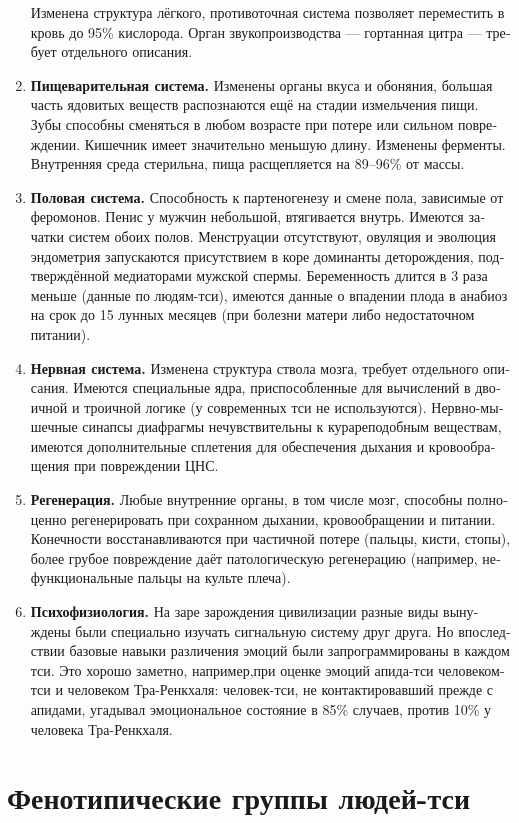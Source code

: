 \documentclass[a4paper,12pt,fleqn]{book}\usepackage{cooltooltips}\usepackage{polyglossia}\setdefaultlanguage[babelshorthands=true]{russian}\setotherlanguage{english}\defaultfontfeatures{Ligatures=TeX,Mapping=tex-text} \usepackage{xcolor}\definecolor{lightgray}{HTML}{bbbbbb}\color{lightgray}\newcommand{\ml}[3]{\textenglish{\textcolor{black}{#3}}}
\begin{document}
\begin{enumerate}
Изменена структура лёгкого, противоточная система позволяет переместить в кровь до 95\% кислорода.
Орган звукопроизводства --- гортанная цитра --- требует отдельного описания.
\item \textbf{Пищеварительная система.}
Изменены органы вкуса и обоняния, большая часть ядовитых веществ распознаются ещё на стадии измельчения пищи.
Зубы способны сменяться в любом возрасте при потере или сильном повреждении.
Кишечник имеет значительно меньшую длину.
Изменены ферменты.
Внутренняя среда стерильна, пища расщепляется на 89--96\% от массы.
\item \textbf{Половая система.}
Способность к партеногенезу и смене пола, зависимые от феромонов.
Пенис у мужчин небольшой, втягивается внутрь.
Имеются зачатки систем обоих полов.
Менструации отсутствуют, овуляция и эволюция эндометрия запускаются присутствием в коре доминанты деторождения, подтверждённой медиаторами мужской спермы.
Беременность длится в 3 раза меньше (данные по людям-тси), имеются данные о впадении плода в анабиоз на срок до 15 лунных месяцев (при болезни матери либо недостаточном питании).
\item \textbf{Нервная система.}
Изменена структура ствола мозга, требует отдельного описания.
Имеются специальные ядра, приспособленные для вычислений в двоичной и троичной логике (у современных тси не используются).
Нервно-мышечные синапсы диафрагмы нечувствительны к курареподобным веществам, имеются дополнительные сплетения для обеспечения дыхания и кровообращения при повреждении ЦНС.
\item \textbf{Регенерация.} Любые внутренние органы, в том числе мозг, способны полноценно регенерировать при сохранном дыхании, кровообращении и питании.
Конечности восстанавливаются при частичной потере (пальцы, кисти, стопы), более грубое повреждение даёт патологическую регенерацию (например, нефункциональные пальцы на культе плеча).
\item \textbf{Психофизиология.}
На заре зарождения цивилизации разные виды вынуждены были специально изучать сигнальную систему друг друга.
Но впоследствии базовые навыки различения эмоций были запрограммированы в каждом тси.
Это хорошо заметно, например,при оценке эмоций апида-тси человеком-тси и человеком Тра-Ренкхаля: человек-тси, не контактировавший прежде с апидами, угадывал эмоциональное состояние в 85\% случаев, против 10\% у человека Тра-Ренкхаля.
\end{enumerate}

\section{Фенотипические группы людей-тси}
\end{document}

